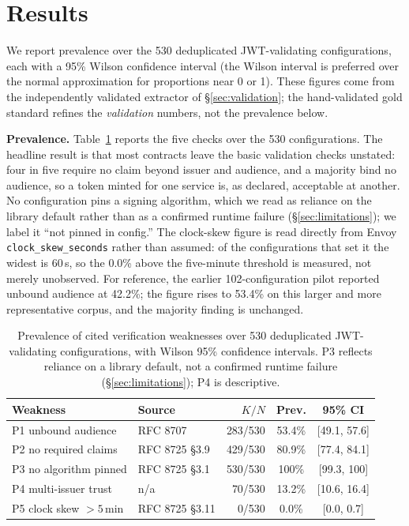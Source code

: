 \section{Results}\label{sec:results}
We report prevalence over the 530 deduplicated JWT-validating configurations, each
with a 95\% Wilson confidence interval (the Wilson interval is preferred over the
normal approximation for proportions near 0 or 1). These figures come from the
independently validated extractor of \S\ref{sec:validation}; the hand-validated
gold standard refines the \emph{validation} numbers, not the prevalence below.

\noindent\textbf{Prevalence.} Table~\ref{tab:prevalence} reports the five checks
over the 530 configurations. The headline result is that most contracts leave the
basic validation checks unstated: four in five require no claim beyond issuer and
audience, and a majority bind no audience, so a token minted for one service is, as
declared, acceptable at another. No configuration pins a signing algorithm, which we
read as reliance on the library default rather than as a confirmed runtime failure
(\S\ref{sec:limitations}); we label it ``not pinned in config.'' The clock-skew
figure is read directly from Envoy \texttt{clock\_skew\_seconds} rather than assumed:
of the configurations that set it the widest is 60\,s, so the 0.0\% above the
five-minute threshold is measured, not merely unobserved. For reference, the earlier
102-configuration pilot reported unbound audience at 42.2\%; the figure rises to
53.4\% on this larger and more representative corpus, and the majority finding is
unchanged.

\begin{table}[t]
\centering\small
\caption{Prevalence of cited verification weaknesses over 530 deduplicated
JWT-validating configurations, with Wilson 95\% confidence intervals. P3 reflects
reliance on a library default, not a confirmed runtime failure
(\S\ref{sec:limitations}); P4 is descriptive.}
\label{tab:prevalence}
\begin{tabular}{@{}llrcc@{}}
\toprule
Weakness & Source & $K/N$ & Prev. & 95\% CI \\
\midrule
P1 unbound audience          & RFC 8707        & 283/530 & 53.4\% & [49.1, 57.6] \\
P2 no required claims         & RFC 8725 \S3.9  & 429/530 & 80.9\% & [77.4, 84.1] \\
P3 no algorithm pinned        & RFC 8725 \S3.1  & 530/530 & 100\%  & [99.3, 100] \\
P4 multi-issuer trust         & n/a             & 70/530  & 13.2\% & [10.6, 16.4] \\
P5 clock skew $>5$\,min       & RFC 8725 \S3.11 & 0/530   & 0.0\%  & [0.0, 0.7] \\
\bottomrule
\end{tabular}
\end{table}

